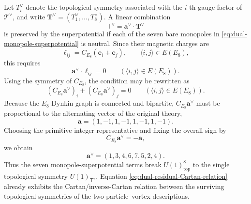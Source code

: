 \documentclass[11pt,a4paper]{article}
\numberwithin{equation}{section}
\begin{document}
Let $T_i^\vee$ denote the topological symmetry associated with the $i$-th gauge factor of $\mathcal T^\vee$, and write $\boldsymbol T^\vee=(T_1^\vee,\ldots,T_8^\vee)$.  A linear combination
\begin{equation}
  \mathsf T^\vee
  =\boldsymbol a^\vee\cdot\boldsymbol T^\vee
  \label{eq:dual-residual-topological-generator}
\end{equation}
is preserved by the superpotential if each of the seven bare monopoles in \eqref{eq:dual-monopole-superpotential} is neutral.  Since their magnetic charges are
\begin{equation}
  \boldsymbol\ell_{ij}
  =C_{E_8}(\boldsymbol e_i+\boldsymbol e_j),
  \qquad
  \langle i,j\rangle\in E(E_8),
  \label{eq:dual-edge-charge-recap}
\end{equation}
this requires
\begin{equation}
  \boldsymbol a^\vee\cdot\boldsymbol\ell_{ij}=0
  \qquad
  (\langle i,j\rangle\in E(E_8)).
  \label{eq:dual-residual-orthogonality}
\end{equation}
Using the symmetry of $C_{E_8}$, the condition may be rewritten as
\begin{equation}
  (C_{E_8}\boldsymbol a^\vee)_i
  +(C_{E_8}\boldsymbol a^\vee)_j=0
  \qquad
  (\langle i,j\rangle\in E(E_8)).
  \label{eq:dual-residual-edge-condition}
\end{equation}
Because the $E_8$ Dynkin graph is connected and bipartite, $C_{E_8}\boldsymbol a^\vee$ must be proportional to the alternating vector of the original theory,
\begin{equation}
  \boldsymbol a=(1,-1,1,-1,1,-1,1,-1).
\end{equation}
Choosing the primitive integer representative and fixing the overall sign by
\begin{equation}
  C_{E_8}\boldsymbol a^\vee=-\boldsymbol a,
  \label{eq:dual-residual-Cartan-relation}
\end{equation}
we obtain
\begin{equation}
  \boldsymbol a^\vee=(1,3,4,6,7,5,2,4).
  \label{eq:dual-residual-vector}
\end{equation}
Thus the seven monopole-superpotential terms break $U(1)^8_{\mathrm{top}}$ to the single topological symmetry $U(1)_{\mathsf T^\vee}$.  Equation \eqref{eq:dual-residual-Cartan-relation} already exhibits the Cartan/inverse-Cartan relation between the surviving topological symmetries of the two particle--vortex descriptions.
\end{document}
